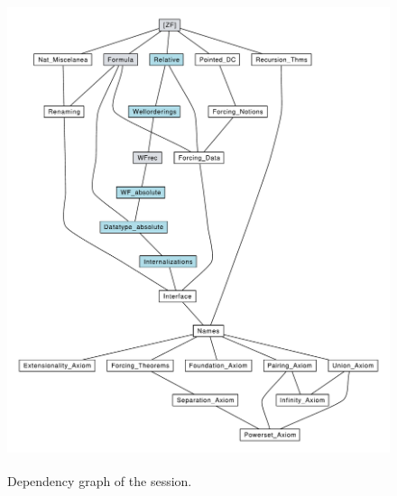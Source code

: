 \begin{figure}[!b]
  \begin{center}
    \includegraphics[height=14cm]{session_graph_colored.pdf}
  \end{center}
  \caption{Dependency graph of the  session.}
  \label{fig:deps}
\end{figure}

